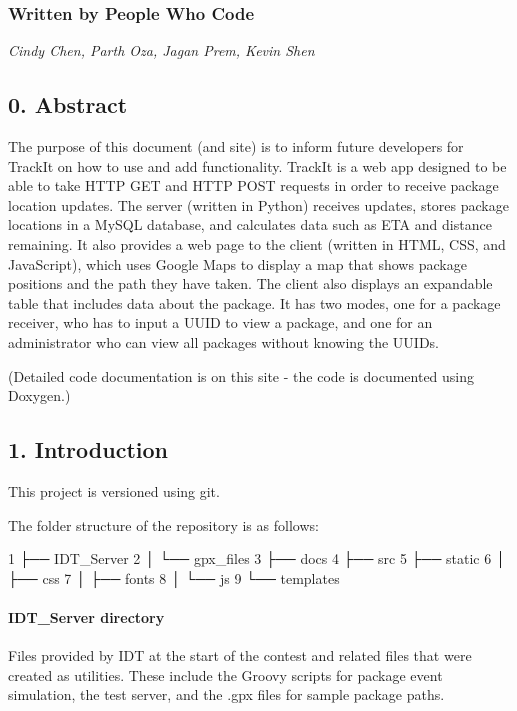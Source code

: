 \subsubsection*{Written by People Who Code}

{\itshape  Cindy Chen, Parth Oza, Jagan Prem, Kevin Shen }

\subsection*{0. Abstract}

The purpose of this document (and site) is to inform future developers for Track\+It on how to use and add functionality. Track\+It is a web app designed to be able to take H\+T\+TP G\+ET and H\+T\+TP P\+O\+ST requests in order to receive package location updates. The server (written in Python) receives updates, stores package locations in a My\+S\+QL database, and calculates data such as E\+TA and distance remaining. It also provides a web page to the client (written in H\+T\+ML, C\+SS, and Java\+Script), which uses Google Maps to display a map that shows package positions and the path they have taken. The client also displays an expandable table that includes data about the package. It has two modes, one for a package receiver, who has to input a U\+U\+ID to view a package, and one for an administrator who can view all packages without knowing the U\+U\+I\+Ds.

(Detailed code documentation is on this site -\/ the code is documented using Doxygen.)

\subsection*{1. Introduction}

This project is versioned using {\ttfamily git}.

The folder structure of the repository is as follows\+:


\begin{DoxyCode}
1 ├── IDT\_Server
2 │   └── gpx\_files
3 ├── docs
4 ├── src
5 ├── static
6 │   ├── css
7 │   ├── fonts
8 │   └── js
9 └── templates
\end{DoxyCode}


\paragraph*{{\ttfamily I\+D\+T\+\_\+\+Server} directory}

Files provided by I\+DT at the start of the contest and related files that were created as utilities. These include the Groovy scripts for package event simulation, the test server, and the .gpx files for sample package paths.

